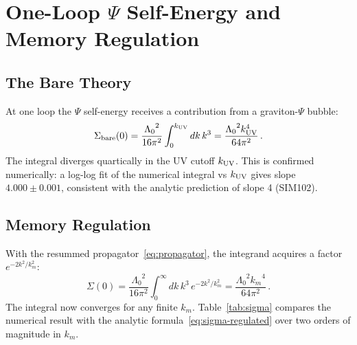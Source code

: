 \documentclass[12pt,a4paper]{article}
\newcommand{\Lz}{{\Lambda_0}}
\newcommand{\km}{{k_m}}
\begin{document}
\section{One-Loop \texorpdfstring{$\Psi$}{Psi} Self-Energy and Memory Regulation}
\label{sec:oneloop-psi}

\subsection{The Bare Theory}

At one loop the $\Psi$ self-energy receives a contribution from a
graviton-$\Psi$ bubble:
\begin{equation}
  \Sigma_{\rm bare}(0)
  = \frac{\Lz^2}{16\pi^2}\int_0^{k_{\rm UV}} dk\,k^3
  = \frac{\Lz^2 k_{\rm UV}^4}{64\pi^2}\,.
  \label{eq:sigma-bare}
\end{equation}
The integral diverges quartically in the UV cutoff $k_{\rm UV}$. This is
confirmed numerically: a log-log fit of the numerical integral vs $k_{\rm UV}$
gives slope $4.000 \pm 0.001$, consistent with the analytic
prediction of slope 4 (SIM102).

\subsection{Memory Regulation}

With the resummed propagator~\eqref{eq:propagator}, the integrand acquires
a factor $e^{-2k^2/k_m^2}$:
\begin{equation}
  \Sigma(0)
  = \frac{\Lz^2}{16\pi^2}\int_0^{\infty} dk\,k^3\,e^{-2k^2/k_m^2}
  = \frac{\Lz^2 \km^4}{64\pi^2}\,.
  \label{eq:sigma-regulated}
\end{equation}
The integral now converges for any finite $\km$. Table~\ref{tab:sigma} compares
the numerical result with the analytic formula~\eqref{eq:sigma-regulated} over
two orders of magnitude in $\km$.
\end{document}
